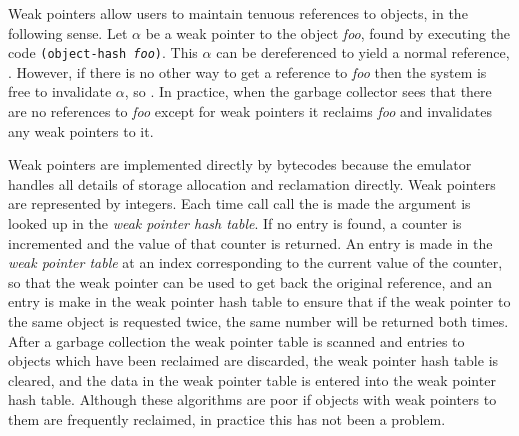 Weak pointers allow users to maintain tenuous references to objects,
in the following sense.  Let $\alpha$ be a weak pointer to the object
\emph{foo}, found by executing the code \texttt{(object-hash \emph{foo})}.
This $\alpha$ can be dereferenced to yield a normal reference,
.  However, if there is no
other way to get a reference to \emph{foo} then the system is free to
invalidate $\alpha$, so .  In
practice, when the garbage collector sees that there are no references
to \emph{foo} except for weak pointers it reclaims \emph{foo} and
invalidates any weak pointers to it.

Weak pointers are implemented directly by bytecodes because the
emulator handles all details of storage allocation and reclamation
directly.  Weak pointers are represented by integers.  Each time call
call the  is made the argument is looked up in the
\emph{weak pointer hash table}.  If no entry is found, a counter is
incremented and the value of that counter is returned.  An entry is
made in the \emph{weak pointer table} at an index corresponding to the
current value of the counter, so that the weak pointer can be used to
get back the original reference, and an entry is make in the weak
pointer hash table to ensure that if the weak pointer to the same
object is requested twice, the same number will be returned both
times.  After a garbage collection the weak pointer table is scanned
and entries to objects which have been reclaimed are discarded, the
weak pointer hash table is cleared, and the data in the weak pointer
table is entered into the weak pointer hash table.  Although these
algorithms are poor if objects with weak pointers to them are
frequently reclaimed, in practice this has not been a problem.
